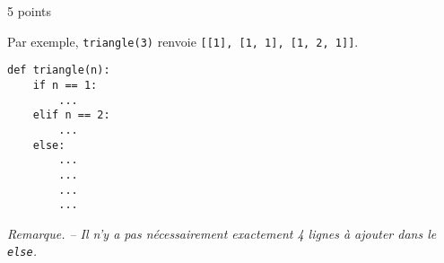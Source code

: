 \documentclass[a4paper,dvipsnames]{article}
\begin{document}
\begin{exercice}[breakable]{5 points}{}
\begin{enumerate}
      Par exemple, \texttt{triangle(3)} renvoie \texttt{[[1], [1, 1], [1, 2, 1]]}.

      \begin{verbatim}
def triangle(n):
    if n == 1:
        ...
    elif n == 2:
        ...
    else:
        ...
        ...
        ...
        ...
      \end{verbatim}

      \textit{Remarque. -- Il n'y a pas nécessairement exactement 4 lignes à ajouter dans le \texttt{else}.}
  \end{enumerate}
\end{exercice}
\end{document}
